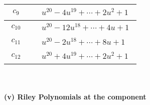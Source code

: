 \documentclass[1p]{elsarticle_modified}
\theoremstyle{definition}
\begin{document}
\begin{tabular}{m{50pt}|m{274pt}}
\hline $$\begin{aligned}c_{9}\end{aligned}$$&$\begin{aligned}
&u^{20}-4 u^{19}+\cdots+2 u^2+1
\end{aligned}$\\
\hline $$\begin{aligned}c_{10}\end{aligned}$$&$\begin{aligned}
&u^{20}-12 u^{18}+\cdots+4 u+1
\end{aligned}$\\
\hline $$\begin{aligned}c_{11}\end{aligned}$$&$\begin{aligned}
&u^{20}-2 u^{18}+\cdots+8 u+1
\end{aligned}$\\
\hline $$\begin{aligned}c_{12}\end{aligned}$$&$\begin{aligned}
&u^{20}+4 u^{19}+\cdots+2 u^2+1
\end{aligned}$\\
\hline
\end{tabular}\\~\\
\newpage\renewcommand{\arraystretch}{1}
\flushleft \textbf{(v) Riley Polynomials at the component}\newline \\
\end{document}
